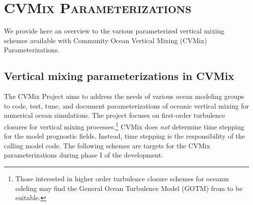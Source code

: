 \chapter{\scshape CVMix Parameterizations}
\label{chapter:cvmix_intro}

\minitoc
\vspace{.5cm}

We provide here an overview to the various parameterized vertical
mixing schemes available with Community Ocean Vertical Mixing
(CVMix) Parameterizations.  


\section{Vertical mixing parameterizations in CVMix}
\label{section:vert_mix_schemes_cvmix}

The CVMix Project aims to address the needs of various ocean modeling
groups to code, test, tune, and document parameterizations of oceanic
vertical mixing for numerical ocean simulations.  The project focuses
on first-order turbulence closures for vertical mixing
processes.\footnote{Those interested in higher order turbulence
  closure schemes for oceanm odeling may find the General Ocean
  Turbulence Model (GOTM) from \cite{GOTM} to be suitable.}  CVMix
does {\it not} determine time stepping for the model prognostic
fields.  Instead, time stepping is the responsibility of the calling
model code.  The following schemes are targets for the CVMix
parameterizations during phase I of the development.

